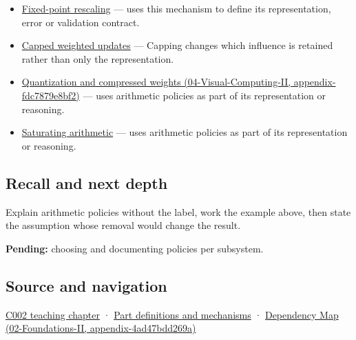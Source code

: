 \begin{itemize}
\item
  \hyperref[appendix-3333db47830f]{Fixed-point rescaling} --- uses this mechanism to define its representation, error or validation contract.
\item
  \hyperref[appendix-1e45d0613db3]{Capped weighted updates} --- Capping changes which influence is retained rather than only the representation.
\item
  \href{../04-Visual-Computing-II/main.pdf\#nameddest=appendix-fdc7879e8bf2}{Quantization and compressed weights (04-Visual-Computing-II, appendix-fdc7879e8bf2)} --- uses arithmetic policies as part of its representation or reasoning.
\item
  \hyperref[appendix-3999c6209649]{Saturating arithmetic} --- uses arithmetic policies as part of its representation or reasoning.
\end{itemize}

\subsection{Recall and next depth}\label{appendix-2ed044358b82-recall-and-next-depth}

Explain arithmetic policies without the label, work the example above, then state the assumption whose removal would change the result.

\textbf{Pending:} choosing and documenting policies per subsystem.

\subsection{Source and navigation}\label{appendix-2ed044358b82-source-and-navigation}

\hyperref[01-foundations-i-ch001-arithmetic-becomes-a-policy]{C002 teaching chapter} · \hyperref[appendix-fd090d982a15]{Part definitions and mechanisms} · \href{../02-Foundations-II/main.pdf\#nameddest=appendix-4ad47bdd269a}{Dependency Map (02-Foundations-II, appendix-4ad47bdd269a)}
